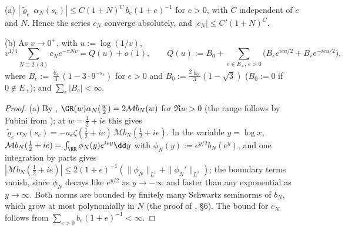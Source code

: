 \begin{lemma}\label{lem:aggregate}
\textup{(a)} $|\tilde\varrho_e\,\alpha_N(s_e)|\le C(1+N)^{C}\,b_e(1+e)^{-1}$ for $e>0$, with $C$ independent of $e$ and $N$. Hence the series
$c_N$ converge absolutely, and $|c_N|\le C'(1+N)^C$.

\textup{(b)} As $v\to0^+$, with $u:=\log(1/v)$,
\[
v^{1/4}\sum_{N\equiv2\,(3)}c_Ne^{-\pi Nv}=Q(u)+o(1),\qquad Q(u):=B_0+\sum_{e\in E_+,\,e>0}\big(B_ee^{ieu/2}+\overline{B_e}e^{-ieu/2}\big),
\]
where $B_e:=\frac{\tilde\varrho_e}3(1-3\cdot9^{-s_e})$ for $e>0$ and $B_0:=\frac{2\tilde\varrho_0}3(1-\sqrt3)$ ($B_0:=0$ if $0\notin E_+$); and
$\sum_e|B_e|<\infty$.\astranote
\end{lemma}

\begin{proof}
(a) By \cite[(3.17)]{BRS}, $\GR(w)\alpha_N(\frac w2)=2\mathcal Mb_N(w)$ for $\Re w>0$ (the range follows by Fubini from \cite[(3.12), (3.16)]{BRS});
at $w=\frac12+ie$ this gives $\tilde\varrho_e\alpha_N(s_e)=-a_e\zeta(\frac12+ie)\,\mathcal Mb_N(\frac12+ie)$. In the variable $y=\log x$,
$\mathcal Mb_N(\frac12+ie)=\int_\RR\phi_N(y)e^{iey}\dd y$ with $\phi_N(y):=e^{y/2}b_N(e^y)$, and one integration by parts gives
$|\mathcal Mb_N(\frac12+ie)|\le2(1+e)^{-1}(\|\phi_N\|_{L^1}+\|\phi_N'\|_{L^1})$; the boundary terms vanish, since $\phi_N$ decays like $e^{y/2}$
as $y\to-\infty$ and faster than any exponential as $y\to\infty$. Both norms are bounded by finitely many Schwartz seminorms of $b_N$, which
grow at most polynomially in $N$ (the proof of \cite[Theorem~2]{RV19}, \S6). The bound for $c_N$ follows from $\sum_{e>0}b_e(1+e)^{-1}<\infty$.


\end{proof}
